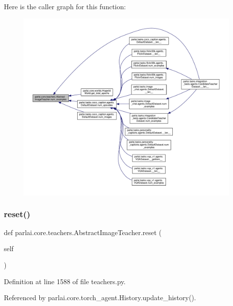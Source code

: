 Here is the caller graph for this function\+:
\nopagebreak
\begin{figure}[H]
\begin{center}
\leavevmode
\includegraphics[width=350pt]{classparlai_1_1core_1_1teachers_1_1AbstractImageTeacher_a4f5565f49b0aef6d084257b5090a7e40_icgraph}
\end{center}
\end{figure}
\mbox{\label{classparlai_1_1core_1_1teachers_1_1AbstractImageTeacher_a13b4576dd3a045944ff1b44cb88a2764}} 
\subsubsection{\texorpdfstring{reset()}{reset()}}
{\footnotesize\ttfamily def parlai.\+core.\+teachers.\+Abstract\+Image\+Teacher.\+reset (\begin{DoxyParamCaption}\item[{}]{self }\end{DoxyParamCaption})}



Definition at line 1588 of file teachers.\+py.



Referenced by parlai.\+core.\+torch\+\_\+agent.\+History.\+update\+\_\+history().

